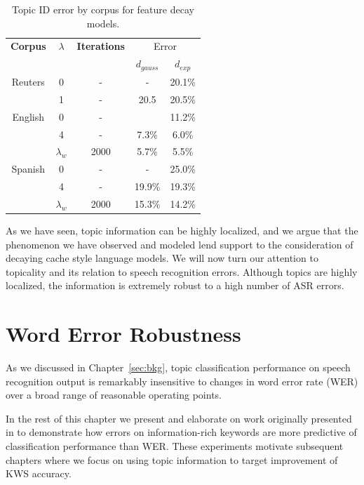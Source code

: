 \begin{table}[htbp]
\centering
\begin{tabular}{c|c|c|cc} \toprule
\bf Corpus & \bf $\lambda$ & \bf Iterations & \multicolumn{2}{c}{Error} \\
           &               &                &  $d_{gauss}$ & $d_{exp}$ \\
\midrule
Reuters & 0 & -  &  -  &  20.1\% \\          
        & 1 & -  &  20.5  &  20.5\% \\          
English & 0 & - &  & 11.2\% \\ %
        & 4 & - & 7.3\% & 6.0\% \\
        & $\lambda_w$ & 2000 & 5.7\% & 5.5\% \\
Spanish & 0 & - & - & 25.0\% \\
        & 4 & - & 19.9\%  & 19.3\% \\
        & $\lambda_w$ &  2000 & 15.3\% & 14.2\% \\ %
\bottomrule
\end{tabular}
\caption[Topic ID error for feature decay models]{\label{tab:drift} Topic ID error by corpus for feature decay models.}
\end{table}


As we have seen, topic information can be highly localized, and we argue that the phenomenon we have observed and modeled lend support to the consideration of decaying cache style language models.   We will now turn our attention to topicality and its relation to speech recognition errors.  Although topics are highly localized, the information is extremely robust to a high number of ASR errors.


\section{Word Error Robustness}

As we discussed in Chapter~\ref{sec:bkg}, topic classification  performance on speech recognition output is remarkably insensitive to changes in word error rate (WER) over a broad range of reasonable operating points.

In the rest of this chapter we present and elaborate on work originally presented in \cite{wintrode2014} to demonstrate how errors on information-rich keywords are more predictive of classification performance than WER.  These experiments motivate subsequent chapters where we focus on using topic information to target improvement of KWS accuracy. %

